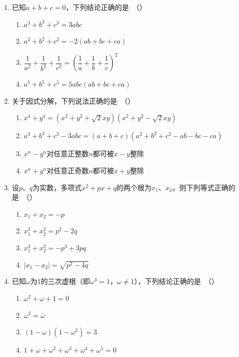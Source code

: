 \documentclass[12pt, a4paper]{ctexart}
\begin{document}
\begin{enumerate}[resume]

\item 已知$a+b+c=0$，下列结论正确的是\ （\quad）
\begin{enumerate}[label=\Alph*., itemsep=0pt, topsep=2pt]
\item $a^3+b^3+c^3=3abc$
\item $a^2+b^2+c^2=-2(ab+bc+ca)$
\item $\dfrac{1}{a^2}+\dfrac{1}{b^2}+\dfrac{1}{c^2}=\left(\dfrac{1}{a}+\dfrac{1}{b}+\dfrac{1}{c}\right)^2$
\item $a^5+b^5+c^5=5abc(ab+bc+ca)$
\end{enumerate}

\item 关于因式分解，下列说法正确的是\ （\quad）
\begin{enumerate}[label=\Alph*., itemsep=0pt, topsep=2pt]
\item $x^4+y^4=(x^2+y^2+\sqrt{2}xy)(x^2+y^2-\sqrt{2}xy)$
\item $a^3+b^3+c^3-3abc=(a+b+c)(a^2+b^2+c^2-ab-bc-ca)$
\item $x^n-y^n$对任意正整数$n$都可被$x-y$整除
\item $x^n+y^n$对任意正奇数$n$都可被$x+y$整除
\end{enumerate}

\item 设$p$、$q$为实数，多项式$x^2+px+q$的两个根为$x_1$、$x_2$，则下列等式正确的是\ （\quad）
\begin{enumerate}[label=\Alph*., itemsep=0pt, topsep=2pt]
\item $x_1+x_2=-p$
\item $x_1^2+x_2^2=p^2-2q$
\item $x_1^3+x_2^3=-p^3+3pq$
\item $|x_1-x_2|=\sqrt{p^2-4q}$
\end{enumerate}

\item 已知$\omega$为$1$的三次虚根（即$\omega^3=1$，$\omega\neq 1$），下列结论正确的是\ （\quad）
\begin{enumerate}[label=\Alph*., itemsep=0pt, topsep=2pt]
\item $\omega^2+\omega+1=0$
\item $\omega^2=\bar{\omega}$
\item $(1-\omega)(1-\omega^2)=3$
\item $1+\omega+\omega^2+\omega^3+\omega^4+\omega^5=0$
\end{enumerate}

\end{enumerate}
\end{document}
